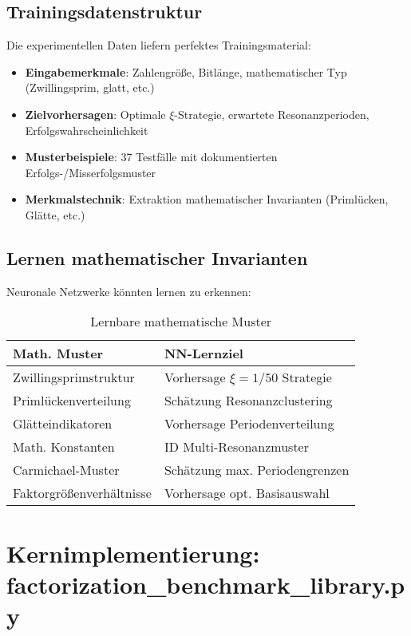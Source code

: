 \documentclass[12pt,a4paper]{article}
\begin{document}
	\subsection{Trainingsdatenstruktur}
	
	Die experimentellen Daten liefern perfektes Trainingsmaterial:
	
	\begin{itemize}
		\item \textbf{Eingabemerkmale}: Zahlengröße, Bitlänge, mathematischer Typ (Zwillingsprim, glatt, etc.)
		\item \textbf{Zielvorhersagen}: Optimale $\xi$-Strategie, erwartete Resonanzperioden, Erfolgswahrscheinlichkeit
		\item \textbf{Musterbeispiele}: 37 Testfälle mit dokumentierten Erfolgs-/Misserfolgsmuster
		\item \textbf{Merkmalstechnik}: Extraktion mathematischer Invarianten (Primlücken, Glätte, etc.)
	\end{itemize}
	
	\subsection{Lernen mathematischer Invarianten}
	
	Neuronale Netzwerke könnten lernen zu erkennen:
	
	\begin{table}[H]
		\centering
		\caption{Lernbare mathematische Muster}
		\begin{tabular}{ll}
			\toprule
			\textbf{Math. Muster} & \textbf{NN-Lernziel} \\
			\midrule
			Zwillingsprimstruktur & Vorhersage $\xi = 1/50$ Strategie \\
			Primlückenverteilung & Schätzung Resonanzclustering \\
			Glätteindikatoren & Vorhersage Periodenverteilung \\
			Math. Konstanten & ID Multi-Resonanzmuster \\
			Carmichael-Muster & Schätzung max. Periodengrenzen \\
			Faktorgrößenverhältnisse & Vorhersage opt. Basisauswahl \\
			\bottomrule
		\end{tabular}
		\label{tab:learnable_patterns}
	\end{table}
	
	\section{Kernimplementierung: factorization\_benchmark\_library.py}
	
\end{document}
